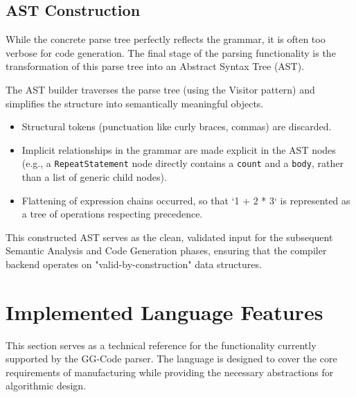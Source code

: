 \subsection{AST Construction}
While the concrete parse tree perfectly reflects the grammar, it is often too verbose for code generation. The final stage of the parsing functionality is the transformation of this parse tree into an Abstract Syntax Tree (AST).

The AST builder traverses the parse tree (using the Visitor pattern) and simplifies the structure into semantically meaningful objects.
\begin{itemize}
    \item Structural tokens (punctuation like curly braces, commas) are discarded.
    \item Implicit relationships in the grammar are made explicit in the AST nodes (e.g., a \texttt{RepeatStatement} node directly contains a \texttt{count} and a \texttt{body}, rather than a list of generic child nodes).
    \item Flattening of expression chains occurred, so that `1 + 2 * 3` is represented as a tree of operations respecting precedence.
\end{itemize}

This constructed AST serves as the clean, validated input for the subsequent Semantic Analysis and Code Generation phases, ensuring that the compiler backend operates on "valid-by-construction" data structures.

\section{Implemented Language Features}

This section serves as a technical reference for the functionality currently supported by the GG-Code parser. The language is designed to cover the core requirements of manufacturing while providing the necessary abstractions for algorithmic design.

